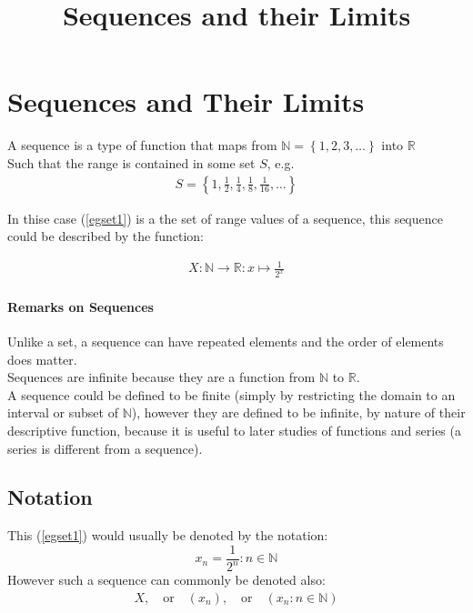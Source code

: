 \documentclass[class=article, crop=false]{standalone}
\title{Sequences and their Limits}
\begin{document}
\section{Sequences and Their Limits}
A sequence is a type of function that maps from $\mathbb{N} = \left\{ 1, 2, 3, \dots \right\}$
into $\mathbb{R}$\\

Such that the range is contained in some set $S$, e.g. \\
\begin{align}
S = \left\{ 1, \frac{1}{2}, \frac{1}{4}, \frac{1}{8}, \frac{1}{16}, \dots \right\}
  \label{egset1}
\end{align}

In thise case (\ref{egset1}) is a the set of range values of a sequence, this sequence could be described by the function:

\begin{align}
  X : \mathbb{N} \rightarrow \mathbb{R} : x \mapsto \frac{1}{2^{x}}
  \label{eg1asfunc}
\end{align}

\paragraph{Remarks on Sequences}

Unlike a set, a sequence can have repeated elements and the order of elements does matter.\\
Sequences are infinite because they are a function from $\mathbb{N}$ to $\mathbb{R}$.\\
A sequence could be defined to be finite (simply by restricting the domain to an interval or subset of $\mathbb{N}$), however they are defined to be infinite, by nature of their descriptive function, because it is useful to later studies of functions and series (a series is different from a sequence).

\subsection{Notation}
This  (\ref{egset1}) would usually be denoted by the notation:
\begin{equation}
  x_n = \frac{1}{2^{n}} : n \in \mathbb{N}
  \label{notegset}
\end{equation}
However such a sequence can commonly be denoted also:
\begin{align}
  X, \quad  \text{or} \quad  (x_{n}), \quad \text{or} \quad (x_{n} : n \in \mathbb{N})
  \label{altnote}
\end{align}
\end{document}
